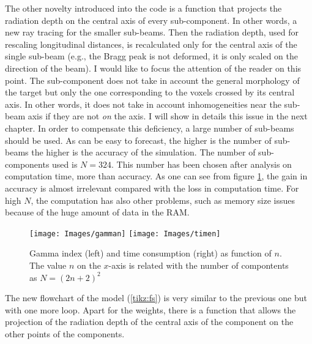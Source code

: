 \documentclass[12pt, a4paper, twoside]{book}
\begin{document}


The other novelty introduced into the code is a function that projects the radiation depth on the central axis of every sub-component. In other words, a new ray tracing for the smaller sub-beams.
Then the radiation depth, used for rescaling longitudinal distances, is recalculated only for the central axis of the single sub-beam (e.g., the Bragg peak is not deformed, it is only scaled on the direction of the beam). I would like to focus the attention of the reader on this point. The sub-component does not take in account the general morphology of the target but only the one corresponding to the voxels crossed by its central axis. In other words, it does not take in account inhomogeneities near the sub-beam axis if they are not \emph{on} the axis. I will show in details this issue in the next chapter. 
In order to compensate this deficiency, a large number of sub-beams should be used. 
As can be easy to forecast, the higher is the number of sub-beams the higher is the accuracy of the simulation. 
The number of sub-components used is $N=324$. This number has been chosen after analysis on computation time, more than accuracy. As one can see from figure \ref{fig:gausn}, the gain in accuracy is almost irrelevant compared with the loss in computation time. For high $N$, the computation has also other problems, such as memory size issues because of the huge amount of data in the RAM.
\begin{figure}[t]
{\texttt{[image: Images/gamman]}}
{\texttt{[image: Images/timen]}}
\caption{Gamma index (left) and time consumption (right) as function of $n$. The value $n$ on the $x$-axis is related with the number of compontents as $N=(2n+2)^2$}
\label{fig:gausn}
\end{figure}

The new flowchart of the model (\ref{tikz:fs}) is very similar to the previous one but with one more loop.
Apart for the weights, there is a function that allows the projection of the radiation depth of the central axis of the component on the other points of the components.
\end{document}
